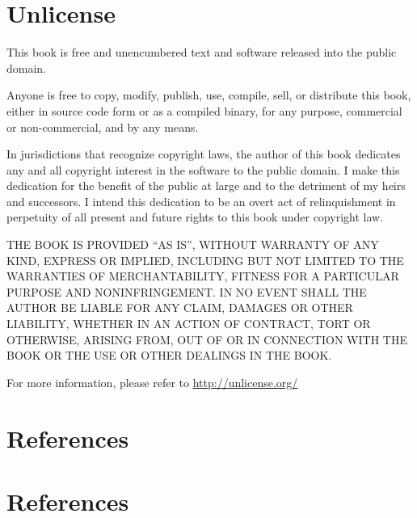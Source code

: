 \documentclass[
  12pt,
  letterpaper,
  DIV=11,
  numbers=noendperiod]{scrreprt}
\theoremstyle{remark}
\begin{document}

\chapter*{Unlicense}\label{apunlicense}


This book is free and unencumbered text and software released into the
public domain.

Anyone is free to copy, modify, publish, use, compile, sell, or
distribute this book, either in source code form or as a compiled
binary, for any purpose, commercial or non-commercial, and by any means.

In jurisdictions that recognize copyright laws, the author of this book
dedicates any and all copyright interest in the software to the public
domain. I make this dedication for the benefit of the public at large
and to the detriment of my heirs and successors. I intend this
dedication to be an overt act of relinquishment in perpetuity of all
present and future rights to this book under copyright law.

THE BOOK IS PROVIDED ``AS IS'', WITHOUT WARRANTY OF ANY KIND, EXPRESS OR
IMPLIED, INCLUDING BUT NOT LIMITED TO THE WARRANTIES OF MERCHANTABILITY,
FITNESS FOR A PARTICULAR PURPOSE AND NONINFRINGEMENT. IN NO EVENT SHALL
THE AUTHOR BE LIABLE FOR ANY CLAIM, DAMAGES OR OTHER LIABILITY, WHETHER
IN AN ACTION OF CONTRACT, TORT OR OTHERWISE, ARISING FROM, OUT OF OR IN
CONNECTION WITH THE BOOK OR THE USE OR OTHER DEALINGS IN THE BOOK.

For more information, please refer to \url{http://unlicense.org/}


\chapter*{References}\label{references}



\chapter*{References}\label{references-1}
\end{document}
